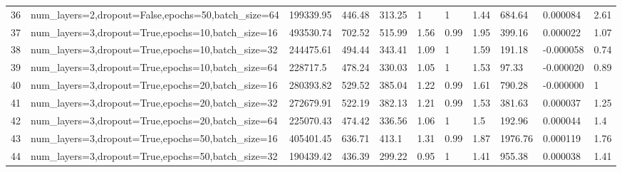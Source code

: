 \begin{longtable}{C{0.8cm} L{2cm} C{1.15cm} C{1.15cm} C{1.15cm} C{1.15cm} C{0.85cm} C{1.25cm} C{1.2cm} C{1.5cm} C{1.0cm}}
36 & num\_layers=2,\newline dropout=False,\newline epochs=50,\newline batch\_size=64 & 199339.95 & 446.48 & 313.25 & 1 & 1 & 1.44 & 684.64 & 0.000084 & 2.61 \\
37 & num\_layers=3,\newline dropout=True,\newline epochs=10,\newline batch\_size=16 & 493530.74 & 702.52 & 515.99 & 1.56 & 0.99 & 1.95 & 399.16 & 0.000022 & 1.07 \\
38 & num\_layers=3,\newline dropout=True,\newline epochs=10,\newline batch\_size=32 & 244475.61 & 494.44 & 343.41 & 1.09 & 1 & 1.59 & 191.18 & -0.000058 & 0.74 \\
39 & num\_layers=3,\newline dropout=True,\newline epochs=10,\newline batch\_size=64 & 228717.5 & 478.24 & 330.03 & 1.05 & 1 & 1.53 & 97.33 & -0.000020 & 0.89 \\
40 & num\_layers=3,\newline dropout=True,\newline epochs=20,\newline batch\_size=16 & 280393.82 & 529.52 & 385.04 & 1.22 & 0.99 & 1.61 & 790.28 & -0.000000 & 1 \\
41 & num\_layers=3,\newline dropout=True,\newline epochs=20,\newline batch\_size=32 & 272679.91 & 522.19 & 382.13 & 1.21 & 0.99 & 1.53 & 381.63 & 0.000037 & 1.25 \\
42 & num\_layers=3,\newline dropout=True,\newline epochs=20,\newline batch\_size=64 & 225070.43 & 474.42 & 336.56 & 1.06 & 1 & 1.5 & 192.96 & 0.000044 & 1.4 \\
43 & num\_layers=3,\newline dropout=True,\newline epochs=50,\newline batch\_size=16 & 405401.45 & 636.71 & 413.1 & 1.31 & 0.99 & 1.87 & 1976.76 & 0.000119 & 1.76 \\
44 & num\_layers=3,\newline dropout=True,\newline epochs=50,\newline batch\_size=32 & 190439.42 & 436.39 & 299.22 & 0.95 & 1 & 1.41 & 955.38 & 0.000038 & 1.41 \\

\end{longtable}
